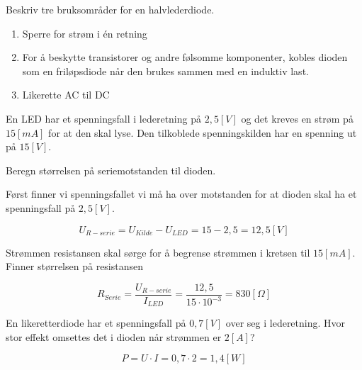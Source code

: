 \begin{question}[name=Spørsmål, topic=dioder]
	Beskriv tre bruksområder for en halvlederdiode.
\end{question}


\begin{solution}[name=Løsningsforslag oppgave]
	\begin{enumerate}[label=\roman*]
		\item Sperre for strøm i én retning
		\item For å beskytte transistorer og andre følsomme komponenter, kobles dioden som en friløpsdiode når den brukes sammen med en induktiv last.
		\item Likerette AC til DC
	\end{enumerate}
\end{solution}

\begin{question}[name=Spørsmål, topic=dioder]
	En LED har et spenningsfall i lederetning på $2,5 [V]$ og det kreves en strøm på $15 [mA]$ for at den skal lyse. Den tilkoblede spenningskilden har en spenning ut på $15 [V]$.
	
	Beregn størrelsen på seriemotstanden til dioden.
\end{question}


	


\begin{solution}[name=Løsningsforslag oppgave]
Først finner vi spenningsfallet vi må ha over motstanden for at dioden skal ha et spenningsfall på $2,5 [V]$.


\[U_{R-serie}=U_{Kilde}-U_{LED}=15-2,5=12,5 [V]\]

Strømmen resistansen skal sørge for å begrense strømmen i kretsen til $15 [mA]$. Finner størrelsen på resistansen

\[R_{Serie}=\frac{U_{R-serie}}{I_{LED}}=\frac{12,5}{15\cdot10^{-3}}=830 [\Omega]\]

\end{solution}


\begin{question}[name=Spørsmål, topic=dioder]
En likeretterdiode har et spenningsfall på $0,7 [V]$ over seg i lederetning. Hvor stor effekt omsettes det i dioden når strømmen er $2 [A]$?
\end{question}


\begin{solution}[name=Løsningsforslag oppgave]
\[P=U\cdot I = 0,7\cdot2=1,4 [W]\]
	
\end{solution}

